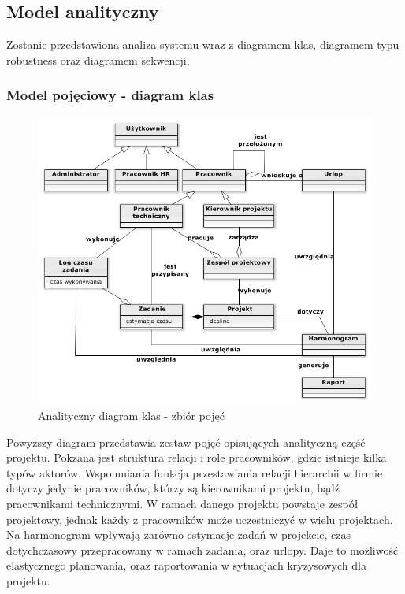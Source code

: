 \subsection{Model analityczny}

\begin{adjustwidth}{2em}{0pt}
Zostanie przedstawiona analiza systemu wraz z diagramem klas, diagramem typu robustness oraz diagramem sekwencji.
\end{adjustwidth}

\subsubsection{Model pojęciowy - diagram klas}


\begin{adjustwidth}{4em}{0pt}

\begin{figure}[H]
    \centering
    \includegraphics[scale=0.9]{diagramy/modelKlas/Classdiagram2.png}
    \caption{Analityczny diagram klas - zbiór pojęć}
    \label{fig:zbior_pojec}
\end{figure}

Powyższy diagram przedstawia zestaw pojęć opisujących analityczną część projektu. Pokzana jest struktura relacji i role pracowników, gdzie istnieje kilka typów aktorów. Wspomniania funkcja przestawiania relacji hierarchii w firmie dotyczy jedynie pracowników, którzy są kierownikami projektu, bądź pracownikami technicznymi. W ramach danego projektu powstaje zespół projektowy, jednak każdy z pracowników może uczestniczyć w wielu projektach. Na harmonogram wpływają zarówno estymacje zadań w projekcie, czas dotychczasowy przepracowany w ramach zadania, oraz urlopy. Daje to możliwość elastycznego planowania, oraz raportowania w sytuacjach kryzysowych dla projektu.

\end{adjustwidth}


